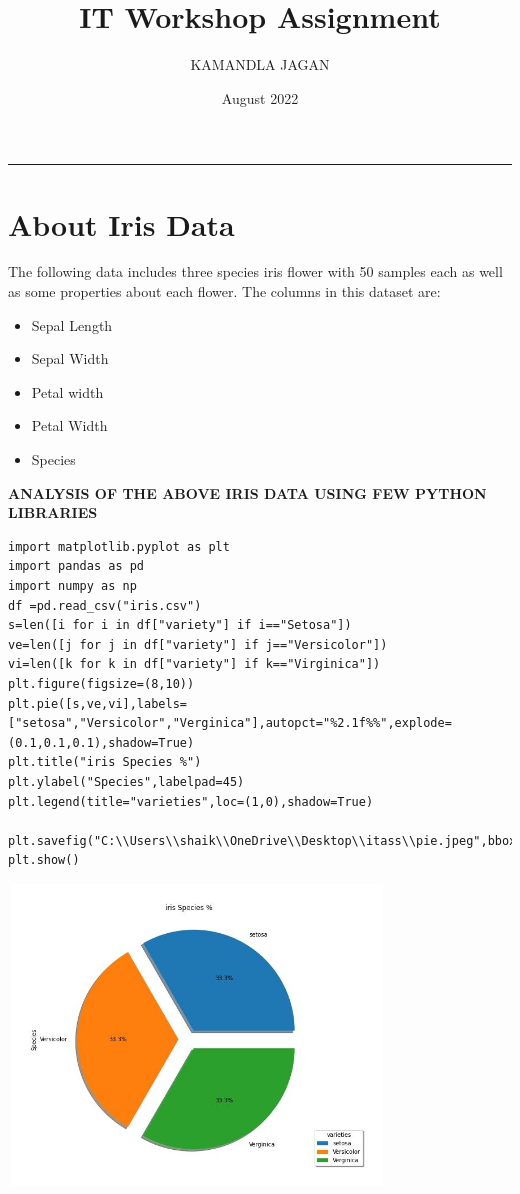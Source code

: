 \documentclass[12pt,a4paper]{article}
\title{IT Workshop Assignment }
\author{KAMANDLA JAGAN}
\affil{B192703}
\affil{CSE-C1}
\date{August 2022}
\begin{document}
\maketitle\vskip-15pt\hrule\vskip15pt


\section{About Iris Data}
The following data includes three species iris flower with 50 samples each as well as
some properties about each flower.
The columns in this dataset are:
\begin{itemize}
\color{brown}
\item Sepal Length
\color{red}
\item Sepal Width
\color{cyan}
\item Petal width
\color{lime}
\item Petal Width
\color{teal}
\item Species
\end{itemize}

\textbf{ANALYSIS OF THE ABOVE IRIS DATA USING FEW PYTHON LIBRARIES}



\begin{verbatim}
import matplotlib.pyplot as plt
import pandas as pd
import numpy as np
df =pd.read_csv("iris.csv")
s=len([i for i in df["variety"] if i=="Setosa"])
ve=len([j for j in df["variety"] if j=="Versicolor"])
vi=len([k for k in df["variety"] if k=="Virginica"])
plt.figure(figsize=(8,10))
plt.pie([s,ve,vi],labels=["setosa","Versicolor","Verginica"],autopct="%2.1f%%",explode=(0.1,0.1,0.1),shadow=True)
plt.title("iris Species %")
plt.ylabel("Species",labelpad=45)
plt.legend(title="varieties",loc=(1,0),shadow=True)

plt.savefig("C:\\Users\\shaik\\OneDrive\\Desktop\\itass\\pie.jpeg",bbox_inches="tight",pad_inches=0.5)
plt.show()
\end{verbatim}

\includegraphics[width=10cm, height=8cm]{pie.jpeg}
\end{document}
